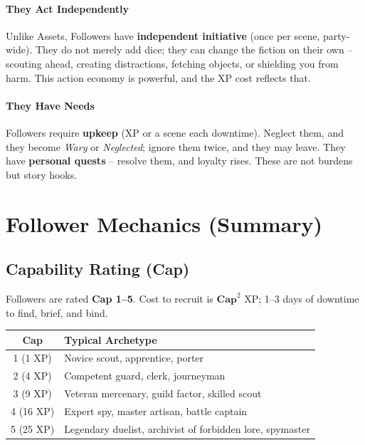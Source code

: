 \paragraph{They Act Independently}
Unlike Assets, Followers have \textbf{independent initiative} (once per scene, party-wide). They do not merely add dice; they can change the fiction on their own -- scouting ahead, creating distractions, fetching objects, or shielding you from harm. This action economy is powerful, and the XP cost reflects that.

\paragraph{They Have Needs}
Followers require \textbf{upkeep} (XP or a scene each downtime). Neglect them, and they become \emph{Wary} or \emph{Neglected}; ignore them twice, and they may leave. They have \textbf{personal quests} -- resolve them, and loyalty rises. These are not burdens but story hooks.

\section{Follower Mechanics (Summary)}
\label{sec:follower-mechanics}

\subsection*{Capability Rating (Cap)}
Followers are rated \textbf{Cap 1--5}. Cost to recruit is \(\textbf{Cap}^2\) XP; 1--3 days of downtime to find, brief, and bind.

\begin{center}
\begin{tabular}{cl}
\toprule
\textbf{Cap} & \textbf{Typical Archetype} \\
\midrule
1 (1 XP) & Novice scout, apprentice, porter \\
2 (4 XP) & Competent guard, clerk, journeyman \\
3 (9 XP) & Veteran mercenary, guild factor, skilled scout \\
4 (16 XP) & Expert spy, master artisan, battle captain \\
5 (25 XP) & Legendary duelist, archivist of forbidden lore, spymaster \\
\bottomrule
\end{tabular}
\end{center}

